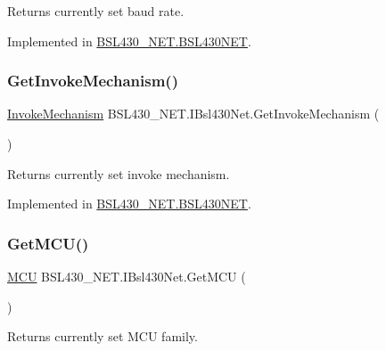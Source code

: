 Returns currently set baud rate. 



Implemented in \mbox{\hyperlink{class_b_s_l430___n_e_t_1_1_b_s_l430_n_e_t_aa2a47062b93eab1ff0ba09d7c0ff11c3}{B\+S\+L430\+\_\+\+N\+E\+T.\+B\+S\+L430\+N\+ET}}.

\mbox{\label{interface_b_s_l430___n_e_t_1_1_i_bsl430_net_a2b6319eca4ebe15b214212e719c4ddb5}} 
\subsubsection{\texorpdfstring{GetInvokeMechanism()}{GetInvokeMechanism()}}
{\footnotesize\ttfamily \mbox{\hyperlink{namespace_b_s_l430___n_e_t_a6571fdf0fbbc8408b8428f4d642c1305}{Invoke\+Mechanism}} B\+S\+L430\+\_\+\+N\+E\+T.\+I\+Bsl430\+Net.\+Get\+Invoke\+Mechanism (\begin{DoxyParamCaption}{ }\end{DoxyParamCaption})}



Returns currently set invoke mechanism. 



Implemented in \mbox{\hyperlink{class_b_s_l430___n_e_t_1_1_b_s_l430_n_e_t_aaf38a4fb21714699bbe2950108ae5c6d}{B\+S\+L430\+\_\+\+N\+E\+T.\+B\+S\+L430\+N\+ET}}.

\mbox{\label{interface_b_s_l430___n_e_t_1_1_i_bsl430_net_ad9efb6c8632e8bd971f34d58ccdeea4b}} 
\subsubsection{\texorpdfstring{GetMCU()}{GetMCU()}}
{\footnotesize\ttfamily \mbox{\hyperlink{namespace_b_s_l430___n_e_t_a2cdaa65be7e1679fc8ca77610b19a490}{M\+CU}} B\+S\+L430\+\_\+\+N\+E\+T.\+I\+Bsl430\+Net.\+Get\+M\+CU (\begin{DoxyParamCaption}{ }\end{DoxyParamCaption})}



Returns currently set M\+CU family. 



